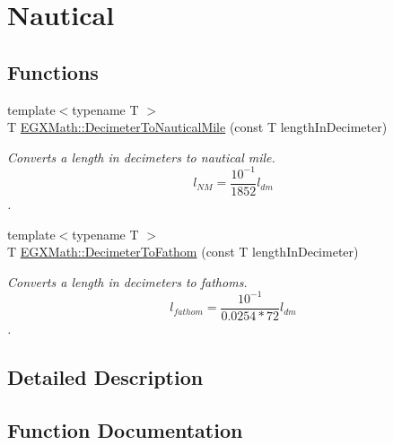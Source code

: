 \hypertarget{group___e_g_x_math-_conversions-_length_conversions-_s_i-_decimeter-_nautical}{}\section{Nautical}
\label{group___e_g_x_math-_conversions-_length_conversions-_s_i-_decimeter-_nautical}
\subsection*{Functions}
\begin{DoxyCompactItemize}
\item 
{\footnotesize template$<$typename T $>$ }\\T \mbox{\hyperlink{group___e_g_x_math-_conversions-_length_conversions-_s_i-_decimeter-_nautical_ga6cc0e9987da30da6a30ddba50971ba2d}{E\+G\+X\+Math\+::\+Decimeter\+To\+Nautical\+Mile}} (const T length\+In\+Decimeter)
\begin{DoxyCompactList}\small\item\em Converts a length in decimeters to nautical mile. \[ l_{NM}= \frac{10^{-1}}{1852} l_{dm} \]. \end{DoxyCompactList}\item 
{\footnotesize template$<$typename T $>$ }\\T \mbox{\hyperlink{group___e_g_x_math-_conversions-_length_conversions-_s_i-_decimeter-_nautical_ga1b0035d719274942290afe80600a2b27}{E\+G\+X\+Math\+::\+Decimeter\+To\+Fathom}} (const T length\+In\+Decimeter)
\begin{DoxyCompactList}\small\item\em Converts a length in decimeters to fathoms. \[ l_{fathom}= \frac{10^{-1}}{0.0254 * 72} l_{dm} \]. \end{DoxyCompactList}\end{DoxyCompactItemize}


\subsection{Detailed Description}


\subsection{Function Documentation}
\mbox{\label{group___e_g_x_math-_conversions-_length_conversions-_s_i-_decimeter-_nautical_ga1b0035d719274942290afe80600a2b27}} 
